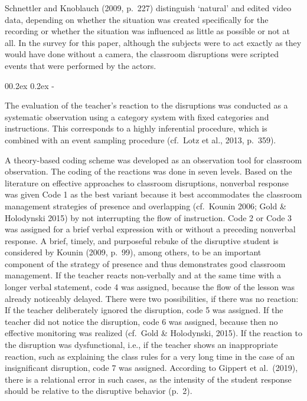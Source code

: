 \documentclass[
  man]{apa6}
\makeatletter
\let\oldsubparagraph\subparagraph
\renewcommand{\subparagraph}[1]{\oldsubparagraph{#1}\mbox{}}
\renewcommand{\subparagraph}[1]{\@startsection{subparagraph}{5}{1em}%
  {0\baselineskip \@plus 0.2ex \@minus 0.2ex}%
  {-\z@\relax}%
  {\normalfont\normalsize\itshape\hspace{\parindent}{#1}\textit{\addperi}}{\relax}}
\makeatother
\begin{document}
Schnettler and Knoblauch (2009, p.~227) distinguish `natural' and edited video data, depending on whether the situation was created specifically for the recording or whether the situation was influenced as little as possible or not at all. In the survey for this paper, although the subjects were to act exactly as they would have done without a camera, the classroom disruptions were scripted events that were performed by the actors.

\hypertarget{coding-teachers-reaction}{%
\subparagraph{Coding Teachers' Reaction}\label{coding-teachers-reaction}}

The evaluation of the teacher's reaction to the disruptions was conducted as a systematic observation using a category system with fixed categories and instructions. This corresponds to a highly inferential procedure, which is combined with an event sampling procedure (cf.~Lotz et al., 2013, p.~359).

A theory-based coding scheme was developed as an observation tool for classroom observation. The coding of the reactions was done in seven levels. Based on the literature on effective approaches to classroom disruptions, nonverbal response was given Code 1 as the best variant because it best accommodates the classroom management strategies of presence and overlapping (cf.~Kounin 2006; Gold \& Holodynski 2015) by not interrupting the flow of instruction. Code 2 or Code 3 was assigned for a brief verbal expression with or without a preceding nonverbal response. A brief, timely, and purposeful rebuke of the disruptive student is considered by Kounin (2009, p.~99), among others, to be an important component of the strategy of presence and thus demonstrates good classroom management. If the teacher reacts non-verbally and at the same time with a longer verbal statement, code 4 was assigned, because the flow of the lesson was already noticeably delayed. There were two possibilities, if there was no reaction: If the teacher deliberately ignored the disruption, code 5 was assigned. If the teacher did not notice the disruption, code 6 was assigned, because then no effective monitoring was realized (cf.~Gold \& Holodynski, 2015). If the reaction to the disruption was dysfunctional, i.e., if the teacher shows an inappropriate reaction, such as explaining the class rules for a very long time in the case of an insignificant disruption, code 7 was assigned. According to Gippert et al.~(2019), there is a relational error in such cases, as the intensity of the student response should be relative to the disruptive behavior (p.~2).
\end{document}
